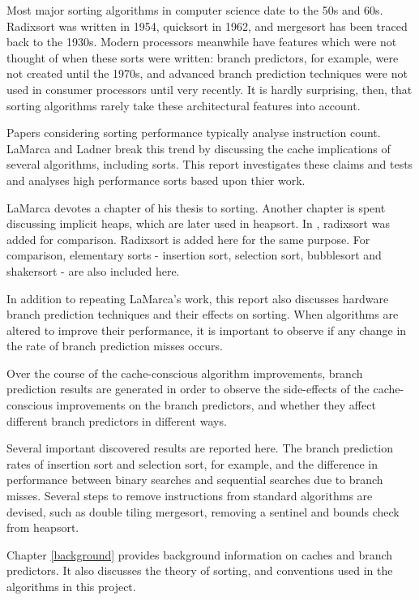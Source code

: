 \label{intro}
Most major sorting algorithms in computer science date to the 50s and 60s.
Radixsort was written in 1954, quicksort in 1962, and mergesort has been traced
back to the 1930s. Modern processors meanwhile have features which were not
thought of when these sorts were written: branch predictors, for example, were
not created until the 1970s, and advanced branch prediction techniques were
not used in consumer processors until very recently. It is hardly surprising,
then, that sorting algorithms rarely take these architectural features into
account.

Papers considering sorting performance typically analyse instruction count.
LaMarca and Ladner \cite{LaMarca96} break this trend by discussing the cache
implications of several algorithms, including sorts. This report 
investigates these claims and tests and analyses high performance sorts
based upon thier work.

LaMarca devotes a chapter of his thesis to sorting. Another chapter is spent
discussing implicit heaps, which are later used in heapsort. In
\cite{LaMarca99}, radixsort was added for comparison. Radixsort is added here
for the same purpose. For comparison, elementary sorts - insertion sort,
selection sort, bubblesort and shakersort - are also included here.

In addition to repeating LaMarca's work, this report also discusses hardware
branch prediction techniques and their effects on sorting. When algorithms are
altered to improve their performance, it is important to observe if any change
in the rate of branch prediction misses occurs.

Over the course of the cache-conscious algorithm improvements, branch prediction
results are generated in order to observe the side-effects of the
cache-conscious improvements on the branch predictors, and whether they affect
different branch predictors in different ways. 

Several important discovered results are reported here. The
branch prediction rates of insertion sort and selection sort, for example, and
the difference in performance between binary searches and sequential searches due
to branch misses. Several steps to remove instructions from standard algorithms
are devised, such as double tiling mergesort, removing a sentinel and bounds
check from heapsort.

Chapter \ref{background} provides background information on caches and branch predictors. It
also discusses the theory of sorting, and conventions used in the algorithms in
this project.

